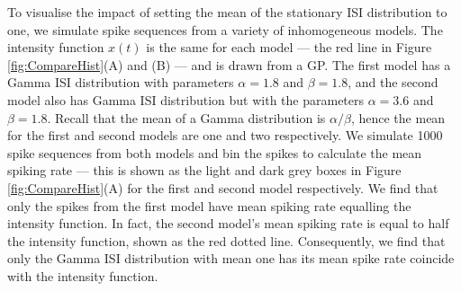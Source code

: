 \documentclass[../main.tex]{subfiles}
\begin{document}
To visualise the impact of setting the mean of the stationary ISI distribution to one, we simulate spike sequences from a variety of inhomogeneous models. The intensity function $x(t)$ is the same for each model --- the red line in Figure \ref{fig:CompareHist}(A) and (B) --- and is drawn from a GP. The first model has a Gamma ISI distribution with parameters $\alpha = 1.8$ and $\beta = 1.8$, and the second model also has Gamma ISI distribution but with the parameters $\alpha = 3.6$ and $\beta = 1.8$. Recall that the mean of a Gamma distribution is $\alpha / \beta$, hence the mean for the first and second models are one and two respectively. We simulate 1000 spike sequences from both models and bin the spikes to calculate the mean spiking rate --- this is shown as the light and dark grey boxes in Figure \ref{fig:CompareHist}(A) for the first and second model respectively.  We find that only the spikes from the first model have mean spiking rate equalling the intensity function. In fact, the second model's mean spiking rate is equal to half the intensity function, shown as the red dotted line. Consequently, we find that only the Gamma ISI distribution with mean one has its mean spike rate coincide with the intensity function. 

\end{document}
